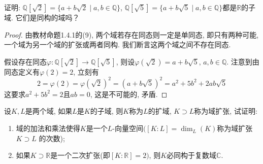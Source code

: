 \begin{problem}
    证明: $\mathbb{Q}[\sqrt 2] = \{a + b\sqrt 2 \mid a, b \in \mathbb{Q}\}$, $\mathbb{Q}[\sqrt 5] = \{a + b\sqrt 5 \mid a, b \in \mathbb{Q}\}$都是$\mathbb{R}$的子域. 它们是同构的域吗？
\end{problem}

\begin{proof}
    由教材命题1.4.1的(9), 两个域若存在同态则一定是单同态, 即只有两种可能, 一个域为另一个域的扩张或两者同构. 我们断言这两个域之间不存在同态.
    
    假设存在同态$\varphi: \mathbb{Q}[\sqrt{2}] \to \mathbb{Q}[\sqrt{5}]$, 则设$\varphi(\sqrt{2}) = a + b\sqrt{5},\, a, b \in \mathbb{Q}$. 注意到由同态定义有$\varphi(2) = 2$, 立刻有
    \[
        2 = \varphi(2) = \varphi(\sqrt{2})^2 = (a + b\sqrt{5})^2 = a^2 + 5b^2 + 2ab\sqrt{5}
    \]
    这要求$a^2 + 5b^2 = 2$且$ab = 0$, 这是不可能的, 矛盾.
\end{proof}

\begin{problem}\label{ex:1.4.9}
    设$K, L$是两个域, 如果$L$是$K$的子域, 则$K$称为$L$的扩域, $K \supset L$称为域扩张, 试证明:
    \begin{enumerate}[(1)]
        \item 域的加法和乘法使得$K$是一个$L$-向量空间$([K:L] = \dim_L(K)$称为域扩张$K \supset L$ 的次数);
        \item 如果$K \supset \mathbb{R}$是一个二次扩张(即$[K:\mathbb{R}] = 2)$, 则$K$必同构于复数域$\mathbb{C}$.
    \end{enumerate}
\end{problem}

